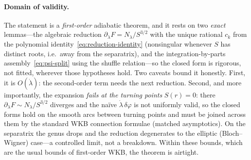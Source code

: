 \documentclass[12pt]{iopart}
\begin{document}
\paragraph{Domain of validity.} The statement is a \emph{first-order} adiabatic
theorem, and it rests on two \emph{exact} lemmas---the algebraic reduction
$\partial_\lambda F=N_\lambda/S^{3/2}$ with the unique rational $c_k$ from the
polynomial identity~\eqref{eq:reduction-identity} (nonsingular whenever $S$ has
distinct roots, i.e.\ away from the separatrix), and the integration-by-parts
assembly~\eqref{eq:psi-split} using the shuffle relation---so the closed form is
rigorous, not fitted, wherever those hypotheses hold. Two caveats bound it honestly.
First, it is $O(\dot\lambda)$: the second-order term needs the next reduction.
Second, and more importantly, the expansion \emph{fails at the turning points}
$S(r)=0$: there $\partial_\lambda F\sim N_\lambda/S^{3/2}$ diverges and the na\"ive
$\dot\lambda\,\delta\varphi$ is not uniformly valid, so the closed forms hold on the
smooth arcs between turning points and must be joined across them by the standard WKB
connection formulae (matched asymptotics). On the separatrix the genus drops and the
reduction degenerates to the elliptic (Bloch--Wigner) case---a controlled limit, not
a breakdown. Within these bounds, which are the usual bounds of first-order WKB, the
theorem is airtight.


\end{document}
